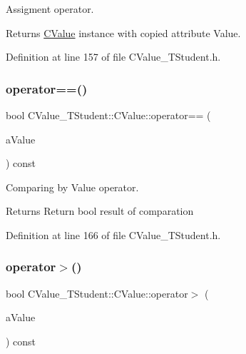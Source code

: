 Assigment operator. 

\begin{DoxyReturn}{Returns}
\hyperlink{class_c_value___t_student_1_1_c_value}{C\+Value} instance with copied attribute Value. 
\end{DoxyReturn}


Definition at line 157 of file C\+Value\+\_\+\+T\+Student.\+h.

\mbox{\label{class_c_value___t_student_1_1_c_value_a81e74014d65406bce259c0b37df25992}} 
\subsubsection{\texorpdfstring{operator==()}{operator==()}}
{\footnotesize\ttfamily bool C\+Value\+\_\+\+T\+Student\+::\+C\+Value\+::operator== (\begin{DoxyParamCaption}\item[{const \hyperlink{class_c_value___t_student_1_1_c_value}{C\+Value} \&}]{a\+Value }\end{DoxyParamCaption}) const\hspace{0.3cm}{\ttfamily [inline]}}



Comparing by Value operator. 

\begin{DoxyReturn}{Returns}
Return {\ttfamily bool} result of comparation 
\end{DoxyReturn}


Definition at line 166 of file C\+Value\+\_\+\+T\+Student.\+h.

\mbox{\label{class_c_value___t_student_1_1_c_value_a5388821b6aef1ce4a0e5411145af9d72}} 
\subsubsection{\texorpdfstring{operator$>$()}{operator>()}}
{\footnotesize\ttfamily bool C\+Value\+\_\+\+T\+Student\+::\+C\+Value\+::operator$>$ (\begin{DoxyParamCaption}\item[{const \hyperlink{class_c_value___t_student_1_1_c_value}{C\+Value} \&}]{a\+Value }\end{DoxyParamCaption}) const\hspace{0.3cm}{\ttfamily [inline]}}



